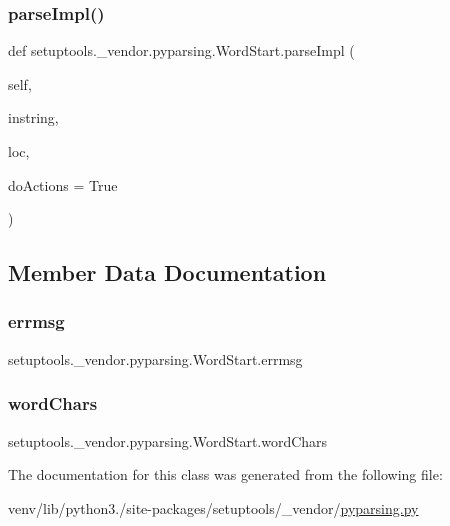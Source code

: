 \subsubsection{\texorpdfstring{parse\+Impl()}{parseImpl()}}
{\footnotesize\ttfamily def setuptools.\+\_\+vendor.\+pyparsing.\+Word\+Start.\+parse\+Impl (\begin{DoxyParamCaption}\item[{}]{self,  }\item[{}]{instring,  }\item[{}]{loc,  }\item[{}]{do\+Actions = {\ttfamily True} }\end{DoxyParamCaption})}



\subsection{Member Data Documentation}
\mbox{\label{classsetuptools_1_1__vendor_1_1pyparsing_1_1WordStart_ae6fee1a4db4b49e5cbf4ca20951b7269}} 
\subsubsection{\texorpdfstring{errmsg}{errmsg}}
{\footnotesize\ttfamily setuptools.\+\_\+vendor.\+pyparsing.\+Word\+Start.\+errmsg}

\mbox{\label{classsetuptools_1_1__vendor_1_1pyparsing_1_1WordStart_a60a6ec3f13aebc95e8f67771765ca6cf}} 
\subsubsection{\texorpdfstring{word\+Chars}{wordChars}}
{\footnotesize\ttfamily setuptools.\+\_\+vendor.\+pyparsing.\+Word\+Start.\+word\+Chars}



The documentation for this class was generated from the following file\+:\begin{DoxyCompactItemize}
\item 
venv/lib/python3./site-\/packages/setuptools/\+\_\+vendor/\hyperlink{setuptools_2__vendor_2pyparsing_8py}{pyparsing.\+py}\end{DoxyCompactItemize}

